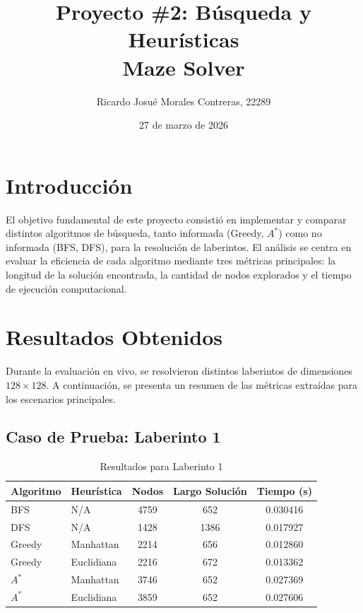 \documentclass[12pt,a4paper]{article}
\title{\textbf{Proyecto \#2: Búsqueda y Heurísticas \\ Maze Solver}}
\author{Ricardo Josué Morales Contreras, 22289 }
\date{27 de marzo de 2026}
\begin{document}
\maketitle

\section{Introducción}
El objetivo fundamental de este proyecto consistió en implementar y comparar distintos algoritmos de búsqueda, tanto informada (Greedy, $A^*$) como no informada (BFS, DFS), para la resolución de laberintos. El análisis se centra en evaluar la eficiencia de cada algoritmo mediante tres métricas principales: la longitud de la solución encontrada, la cantidad de nodos explorados y el tiempo de ejecución computacional.

\section{Resultados Obtenidos}
Durante la evaluación en vivo, se resolvieron distintos laberintos de dimensiones $128 \times 128$. A continuación, se presenta un resumen de las métricas extraídas para los escenarios principales.

\subsection{Caso de Prueba: Laberinto 1}
\begin{table}[h]
\centering
\begin{tabular}{llccc}
\toprule
\textbf{Algoritmo} & \textbf{Heurística} & \textbf{Nodos} & \textbf{Largo Solución} & \textbf{Tiempo (s)} \\
\midrule
BFS & N/A & 4759 & 652 & 0.030416 \\
DFS & N/A & 1428 & 1386 & 0.017927  \\
Greedy & Manhattan & 2214 & 656 & 0.012860  \\
Greedy & Euclidiana & 2216 & 672 & 0.013362 \\
$A^*$ & Manhattan & 3746 & 652 & 0.027369  \\
$A^*$ & Euclidiana & 3859 & 652 & 0.027606  \\
\bottomrule
\end{tabular}
\caption{Resultados para Laberinto 1}
\end{table}
\end{document}
